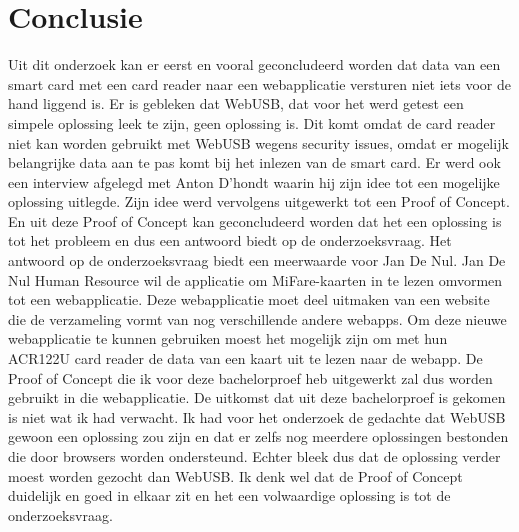 
\chapter{Conclusie}%
\label{ch:conclusie}


Uit dit onderzoek kan er eerst en vooral geconcludeerd worden dat data van een smart card met een card reader naar een webapplicatie versturen niet iets voor de hand liggend is. Er is gebleken dat WebUSB, dat voor het werd getest een simpele oplossing leek te zijn, geen oplossing is. Dit komt omdat de card reader niet kan worden gebruikt met WebUSB wegens security issues, omdat er mogelijk belangrijke data aan te pas komt bij het inlezen van de smart card.
Er werd ook een interview afgelegd met Anton D'hondt waarin hij zijn idee tot een mogelijke oplossing uitlegde. Zijn idee werd vervolgens uitgewerkt tot een Proof of Concept. En uit deze Proof of Concept kan geconcludeerd worden dat het een oplossing is tot het probleem en dus een antwoord biedt op de onderzoeksvraag.
Het antwoord op de onderzoeksvraag biedt een meerwaarde voor Jan De Nul. Jan De Nul Human Resource wil de applicatie om MiFare-kaarten in te lezen omvormen tot een webapplicatie. Deze webapplicatie moet deel uitmaken van een website die de verzameling vormt van nog verschillende andere webapps. Om deze nieuwe webapplicatie te kunnen gebruiken moest het mogelijk zijn om met hun ACR122U card reader de data van een kaart uit te lezen naar de webapp. De Proof of Concept die ik voor deze bachelorproef heb uitgewerkt zal dus worden gebruikt in die webapplicatie.
De uitkomst dat uit deze bachelorproef is gekomen is niet wat ik had verwacht. Ik had voor het onderzoek de gedachte dat WebUSB gewoon een oplossing zou zijn en dat er zelfs nog meerdere oplossingen bestonden die door browsers worden ondersteund. Echter bleek dus dat de oplossing verder moest worden gezocht dan WebUSB. Ik denk wel dat de Proof of Concept duidelijk en goed in elkaar zit en het een volwaardige oplossing is tot de onderzoeksvraag.

